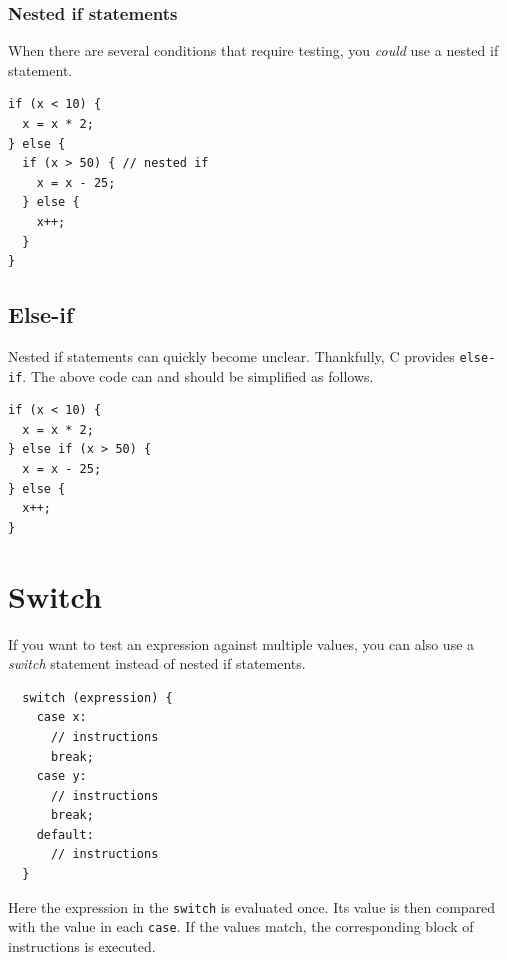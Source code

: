 \documentclass[11pt,fleqn]{book} %
\def\Cpp{{C\nolinebreak[4]\hspace{-.05em}\raisebox{.4ex}{\tiny\bf ++}}}
\begin{document}
\subsubsection{Nested if statements}
When there are several conditions that require testing, you \emph{could} use a nested if statement.

\begin{example}
	\phantom{ }
	\begin{verbatim}
if (x < 10) {
  x = x * 2;
} else {
  if (x > 50) { // nested if
    x = x - 25;
  } else {
    x++;
  }
}
	\end{verbatim}
\end{example}

\subsection{Else-if}

\noindent
Nested if statements can quickly become unclear. Thankfully, \Cpp{} provides \texttt{else-if}. The above code can and should be simplified as follows.

\begin{example}[Else-if]
	\phantom{ }
	\begin{verbatim}
if (x < 10) {
  x = x * 2;
} else if (x > 50) {
  x = x - 25;
} else {
  x++;
}
	\end{verbatim}
\end{example}

\section{Switch}
If you want to test an expression against multiple values, you can also use a \emph{switch} statement instead of nested if statements.\\

\begin{definition}[Switch]
	\phantom{ }
	\begin{verbatim}
  switch (expression) {
    case x:
      // instructions
      break;
    case y:
      // instructions
      break;
    default:
      // instructions
  }
	\end{verbatim}
\end{definition}

\noindent
Here the expression in the \texttt{switch} is evaluated once. Its value is then compared with the value in each \texttt{case}. If the values match, the corresponding block of instructions is executed.
\end{document}
